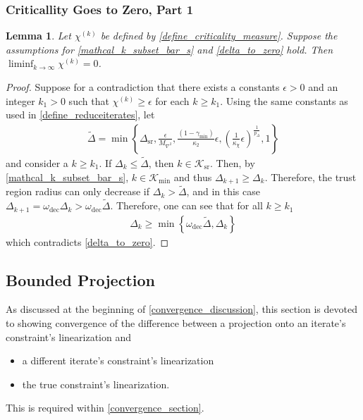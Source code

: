 \documentclass{article}
\newtheorem{lemma}[theorem]{Lemma}
\theoremstyle{case}
\numberwithin{theorem}{subsection}
\newcommand{\chik}{{\chi^{(k)}}}
\newcommand{\dk}{\Delta_k}
\newcommand{\dkpo}{\Delta_{k+1}}
\newcommand{\dsr}{{\Delta_{\textrm{sr}}}}
\newcommand{\gammasm}{\gamma_{\textrm{min}}}
\newcommand{\maxhessian}{{M_{\nabla^2}}}
\newcommand{\omegadec}{\omega_{\text{dec}}}
\newcommand{\miniterates}{{\mathcal K_{\textrm{min}}}}
\newcommand{\reduceiterates}{{\mathcal K_{\textrm{sr}}}}
\newcommand{\theirc}{{\kappa_2}}
\begin{document}
\subsubsection{Criticallity Goes to Zero, Part 1}
\begin{lemma}
\label{liminf_chi_to_zero}
Let $\chik$ be defined by \cref{define_criticality_measure}.
Suppose the assumptions for \cref{mathcal_k_subset_bar_s} and \cref{delta_to_zero} hold.
Then $\liminf_{k\to\infty} \chik = 0$.
\end{lemma}
 

\begin{proof}
Suppose for a contradiction that there exists a constants $\epsilon > 0$ and an integer $k_1 > 0$ such that $\chik \ge \epsilon$ for each $k \ge k_1$.
Using the same constants as used in \cref{define_reduceiterates}, let
\begin{align*}
\tilde \Delta = \min \left\{
\dsr, 
\frac{\epsilon}{\maxhessian}, 
\frac{(1 - \gammasm)}{\theirc} \epsilon,
\left(\frac 1 {\kappa_{\chi}} \epsilon \right)^{\frac 1 {p_{\Delta}}},
1\right\}
\end{align*}
and consider a $k \ge k_1$.
If $\dk \le \tilde \Delta$, then $k \in \reduceiterates$.
Then, by \cref{mathcal_k_subset_bar_s},  $k \in \miniterates$ and thus $\dkpo \ge \dk$.
Therefore, the trust region radius can only decrease if $\dk > \tilde \Delta$, and in this case $\dkpo = \omegadec\dk > \omegadec \tilde \Delta$.
Therefore, one can see that for all $k \ge k_1$
\begin{align}
\dk \ge \min\left\{\omegadec \tilde \Delta, \dk \right\}
\end{align}
which contradicts \cref{delta_to_zero}.
\end{proof}



\subsection{Bounded Projection}
\label{bounding_the_projection_section}
As discussed at the beginning of \cref{convergence_discussion}, this section is devoted to showing convergence of the difference
between a projection onto an iterate's constraint's linearization and
\begin{itemize}
\item a different iterate's constraint's linearization 
\item the true constraint's linearization.
\end{itemize}
This is required within \cref{convergence_section}.
\end{document}
